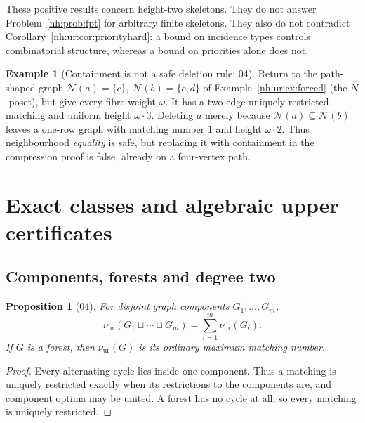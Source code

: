 \documentclass[11pt,a4paper]{article}
\newtheorem{proposition}[theorem]{Proposition}
\theoremstyle{definition}
\newtheorem{example}[theorem]{Example}
\theoremstyle{remark}
\newcommand{\Nb}{\mathcal N}
\newcommand{\nuur}{\nu_{\mathrm{ur}}}
\begin{document}
These positive results concern height-two skeletons. They do not answer
Problem~\ref{nh:prob:fpt} for arbitrary finite skeletons. They also do not
contradict Corollary~\ref{nh:ur:cor:priorityhard}: a bound on incidence types
controls combinatorial structure, whereas a bound on priorities alone does
not.

\begin{example}[Containment is not a safe deletion rule; 04]\label{nh:ur:ex:containment}
Return to the path-shaped graph $\Nb(a)=\{c\}$, $\Nb(b)=\{c,d\}$ of
Example~\ref{nh:ur:ex:forced} (the $N$-poset), but give every fibre weight
$\omega$. It has a two-edge uniquely restricted matching and uniform height
$\omega\cdot3$. Deleting $a$ merely because $\Nb(a)\subseteq\Nb(b)$ leaves a
one-row graph with matching number $1$ and height $\omega\cdot2$. Thus
neighbourhood \emph{equality} is safe, but replacing it with containment in
the compression proof is false, already on a four-vertex path.
\end{example}

\section{Exact classes and algebraic upper certificates}\label{nh:ur:sec:classes}
\setcounter{equation}{0}

\subsection{Components, forests and degree two}
\begin{proposition}[04]\label{nh:ur:prop:components}
For disjoint graph components $G_1,\ldots,G_m$,
\[
 \nuur(G_1\sqcup\cdots\sqcup G_m)=\sum_{i=1}^m\nuur(G_i).
\]
If $G$ is a forest, then $\nuur(G)$ is its ordinary maximum matching number.
\end{proposition}
\begin{proof}
Every alternating cycle lies inside one component. Thus a matching is
uniquely restricted exactly when its restrictions to the components are, and
component optima may be united. A forest has no cycle at all, so every
matching is uniquely restricted.
\end{proof}
\end{document}
